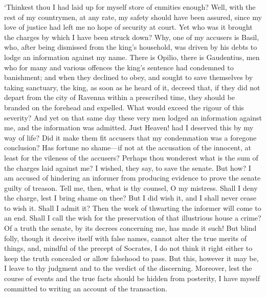 \documentclass[11pt]{book}
\begin{document}
`Thinkest thou I had laid up for myself store of enmities enough? Well,
with the rest of my countrymen, at any rate, my safety should have been
assured, since my love of justice had left me no hope of security at
court. Yet who was it brought the charges by which I have been struck
down? Why, one of my accusers is Basil, who, after being dismissed from
the king's household, was driven by his debts to lodge an information
against my name. There is Opilio, there is Gaudentius, men who for many
and various offences the king's sentence had condemned to banishment;
and when they declined to obey, and sought to save themselves by taking
sanctuary, the king, as soon as he heard of it, decreed that, if they
did not depart from the city of Ravenna within a prescribed time, they
should be branded on the forehead and expelled. What would exceed the
rigour of this severity? And yet on that same day these very men lodged
an information against me, and the information was admitted. Just
Heaven! had I deserved this by my way of life? Did it make them fit
accusers that my condemnation was a foregone conclusion? Has fortune no
shame---if not at the accusation of the innocent, at least for the
vileness of the accusers? Perhaps thou wonderest what is the sum of the
charges laid against me? I wished, they say, to save the senate. But
how? I am accused of hindering an informer from producing evidence to
prove the senate guilty of treason. Tell me, then, what is thy counsel,
O my mistress. Shall I deny the charge, lest I bring shame on thee? But
I did wish it, and I shall never cease to wish it. Shall I admit it?
Then the work of thwarting the informer will come to an end. Shall I
call the wish for the preservation of that illustrious house a crime?
Of a truth the senate, by its decrees concerning me, has made it such!
But blind folly, though it deceive itself with false names, cannot alter
the true merits of things, and, mindful of the precept of Socrates, I do
not think it right either to keep the truth concealed or allow falsehood
to pass. But this, however it may be, I leave to thy judgment and to the
verdict of the discerning. Moreover, lest the course of events and the
true facts should be hidden from posterity, I have myself committed to
writing an account of the transaction.
\end{document}
